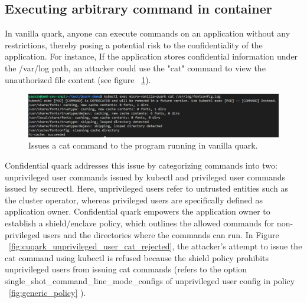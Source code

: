 \subsection{Executing arbitrary command in container}
In vanilla quark, anyone can execute commands on an application without any restrictions, thereby posing a potential risk to the confidentiality of the application.  For instance, If the application stores confidential information under the /var/log path, an attacker could use the "cat" 
command to view the unauthorized file content (see figure ~\ref{fig:vanila_execute_cat_cmd}).


\begin{figure}[H]
    \centering
    \includegraphics[width=1\textwidth]{images/vanila_execute_cat_cmd.png}
    \caption[Issues a cat command to the program running in vanilla quark]{Issues a cat command to the program running in vanilla quark.}
    \label{fig:vanila_execute_cat_cmd}
\end{figure}


Confidential quark addresses this issue by categorizing commands into two: unprivileged user commands issued by kubectl and privileged user commands issued by securectl. Here, unprivileged users refer to untrusted entities such as the cluster operator, 
whereas privileged users are specifically defined as application owner. Confidential quark empowers the application owner to establish a shield/enclave policy, which outlines the allowed commands for non-privileged users and the directories where the commands can run. 
In Figure ~\ref{fig:cuqark_unprivileged_user_cat_rejected}, the attacker's attempt to issue the cat command using kubectl is refused because the shield policy prohibits unprivileged users from issuing cat commands (refers to the option single\_shot\_command\_line\_mode\_configs of 
unprivileged user config in policy ~\ref{fig:generic_policy} ).

